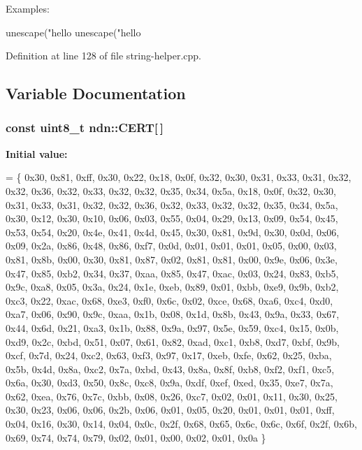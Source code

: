 Examples\+: \begin{DoxyVerb}unescape("hello%
unescape("hello%
 

Definition at line 128 of file string-\/helper.\+cpp.



\subsection{Variable Documentation}
\subsubsection[{\texorpdfstring{C\+E\+RT}{CERT}}]{\setlength{\rightskip}{0pt plus 5cm}const uint8\+\_\+t ndn\+::\+C\+E\+RT\mbox{[}$\,$\mbox{]}}\hypertarget{namespacendn_ae236401df9dc24c1e6526a2aed06bfe5}{}\label{namespacendn_ae236401df9dc24c1e6526a2aed06bfe5}
{\bfseries Initial value\+:}
\begin{DoxyCode}
= \{
0x30, 0x81, 0xff, 0x30, 0x22, 0x18, 0x0f, 0x32, 0x30, 0x31, 0x33, 0x31, 0x32, 0x32, 0x36,
0x32, 0x33, 0x32, 0x32, 0x35, 0x34, 0x5a, 0x18, 0x0f, 0x32, 0x30, 0x31, 0x33, 0x31, 0x32,
0x32, 0x36, 0x32, 0x33, 0x32, 0x32, 0x35, 0x34, 0x5a, 0x30, 0x12, 0x30, 0x10, 0x06, 0x03,
0x55, 0x04, 0x29, 0x13, 0x09, 0x54, 0x45, 0x53, 0x54, 0x20, 0x4e, 0x41, 0x4d, 0x45, 0x30,
0x81, 0x9d, 0x30, 0x0d, 0x06, 0x09, 0x2a, 0x86, 0x48, 0x86, 0xf7, 0x0d, 0x01, 0x01, 0x01,
0x05, 0x00, 0x03, 0x81, 0x8b, 0x00, 0x30, 0x81, 0x87, 0x02, 0x81, 0x81, 0x00, 0x9e, 0x06,
0x3e, 0x47, 0x85, 0xb2, 0x34, 0x37, 0xaa, 0x85, 0x47, 0xac, 0x03, 0x24, 0x83, 0xb5, 0x9c,
0xa8, 0x05, 0x3a, 0x24, 0x1e, 0xeb, 0x89, 0x01, 0xbb, 0xe9, 0x9b, 0xb2, 0xc3, 0x22, 0xac,
0x68, 0xe3, 0xf0, 0x6c, 0x02, 0xce, 0x68, 0xa6, 0xc4, 0xd0, 0xa7, 0x06, 0x90, 0x9c, 0xaa,
0x1b, 0x08, 0x1d, 0x8b, 0x43, 0x9a, 0x33, 0x67, 0x44, 0x6d, 0x21, 0xa3, 0x1b, 0x88, 0x9a,
0x97, 0x5e, 0x59, 0xc4, 0x15, 0x0b, 0xd9, 0x2c, 0xbd, 0x51, 0x07, 0x61, 0x82, 0xad, 0xc1,
0xb8, 0xd7, 0xbf, 0x9b, 0xcf, 0x7d, 0x24, 0xc2, 0x63, 0xf3, 0x97, 0x17, 0xeb, 0xfe, 0x62,
0x25, 0xba, 0x5b, 0x4d, 0x8a, 0xc2, 0x7a, 0xbd, 0x43, 0x8a, 0x8f, 0xb8, 0xf2, 0xf1, 0xc5,
0x6a, 0x30, 0xd3, 0x50, 0x8c, 0xc8, 0x9a, 0xdf, 0xef, 0xed, 0x35, 0xe7, 0x7a, 0x62, 0xea,
0x76, 0x7c, 0xbb, 0x08, 0x26, 0xc7, 0x02, 0x01, 0x11, 0x30, 0x25, 0x30, 0x23, 0x06, 0x06,
0x2b, 0x06, 0x01, 0x05, 0x20, 0x01, 0x01, 0x01, 0xff, 0x04, 0x16, 0x30, 0x14, 0x04, 0x0c,
0x2f, 0x68, 0x65, 0x6c, 0x6c, 0x6f, 0x2f, 0x6b, 0x69, 0x74, 0x74, 0x79, 0x02, 0x01, 0x00,
0x02, 0x01, 0x0a
\}
\end{DoxyCode}



\end{DoxyVerb}
